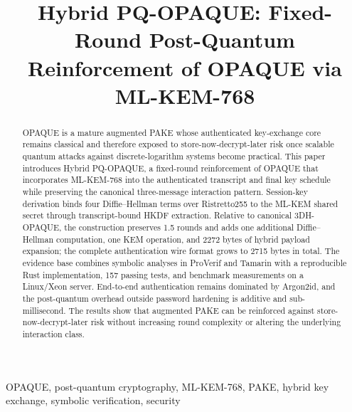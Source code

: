\documentclass[conference]{IEEEtran}
\begin{document}
\title{Hybrid PQ-OPAQUE: Fixed-Round Post-Quantum Reinforcement of OPAQUE via ML-KEM-768}


\author{
}

\maketitle

\begin{abstract}
OPAQUE is a mature augmented PAKE whose authenticated key-exchange core remains classical and therefore exposed to store-now-decrypt-later risk once scalable quantum attacks against discrete-logarithm systems become practical. This paper introduces Hybrid PQ-OPAQUE, a fixed-round reinforcement of OPAQUE that incorporates ML-KEM-768 into the authenticated transcript and final key schedule while preserving the canonical three-message interaction pattern. Session-key derivation binds four Diffie--Hellman terms over Ristretto255 to the ML-KEM shared secret through transcript-bound HKDF extraction. Relative to canonical 3DH-OPAQUE, the construction preserves 1.5 rounds and adds one additional Diffie--Hellman computation, one KEM operation, and 2272 bytes of hybrid payload expansion; the complete authentication wire format grows to 2715 bytes in total. The evidence base combines symbolic analyses in ProVerif and Tamarin with a reproducible Rust implementation, 157 passing tests, and benchmark measurements on a Linux/Xeon server. End-to-end authentication remains dominated by Argon2id, and the post-quantum overhead outside password hardening is additive and sub-millisecond. The results show that augmented PAKE can be reinforced against store-now-decrypt-later risk without increasing round complexity or altering the underlying interaction class.
\end{abstract}

\begin{IEEEkeywords}
OPAQUE, post-quantum cryptography, ML-KEM-768, PAKE, hybrid key exchange, symbolic verification, security
\end{IEEEkeywords}
\end{document}
